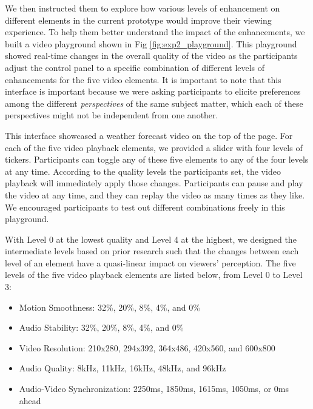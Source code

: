 We then instructed them to explore how various levels of enhancement on different elements in the current prototype would improve their viewing experience. To help them better understand the impact of the enhancements, we built a video playground shown in Fig \ref{fig:exp2_playground}. This playground showed real-time changes in the overall quality of the video as the participants adjust the control panel to a specific combination of different levels of enhancements for the five video elements. It is important to note that this interface is important because we were asking participants to elicite preferences among the different \textit{perspectives} of the same subject matter, which each of these perspectives might not be independent from one another.

This interface showcased a weather forecast video on the top of the page. For each of the five video playback elements, we provided a slider with four levels of tickers. Participants can toggle any of these five elements to any of the four levels at any time. According to the quality levels the participants set, the video playback will immediately apply those changes. Participants can pause and play the video at any time, and they can replay the video as many times as they like. We encouraged participants to test out different combinations freely in this playground.

With Level 0 at the lowest quality and Level 4 at the highest, we designed the intermediate levels based on prior research \cite{claypool1999effects,oeldorf2012bad, noll1993wideband,knoche2008low, steinmetz1996human} such that the changes between each level of an element have a quasi-linear impact on viewers' perception. The five levels of the five video playback elements are listed below, from Level 0 to Level 3:
\begin{itemize}
    \item Motion Smoothness: 32\%, 20\%, 8\%, 4\%, and 0\%
    \item Audio Stability: 32\%, 20\%, 8\%, 4\%, and 0\%
    \item Video Resolution: 210x280, 294x392, 364x486, 420x560, and 600x800 
    \item Audio Quality: 8kHz, 11kHz, 16kHz, 48kHz, and 96kHz
    \item Audio-Video Synchronization: 2250ms, 1850ms,  1615ms, 1050ms, or 0ms ahead
\end{itemize}

